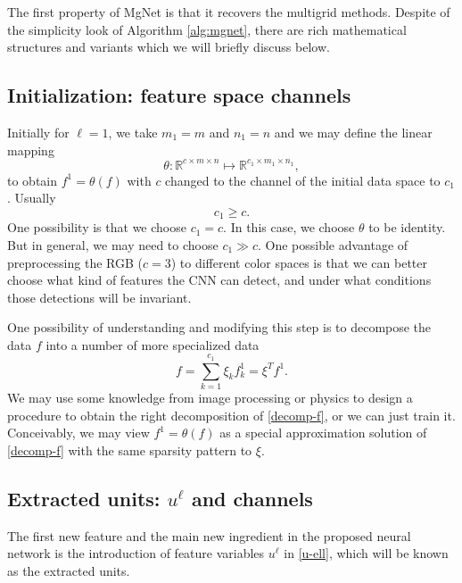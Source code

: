 The first property of MgNet is that it recovers the multigrid methods.
Despite of the simplicity look of Algorithm \ref{alg:mgnet}, there
are rich mathematical structures and variants which we will briefly discuss below.

\subsection{Initialization: feature space channels}
Initially for $\ell=1$,  we take $m_1 = m$ and $n_1 = n$ and we may define the linear mapping 
\begin{equation}
\label{eq:6}
\theta: \mathbb R^{c \times m\times n }
\mapsto \mathbb R^{c_1 \times m_1\times n_1 },
\end{equation}
to obtain $f^{1} = \theta(f)$ with $c$ %
changed to the channel of the initial
data space to $c_1$.   Usually
\begin{equation}
\label{cc}
c_1\ge c.  
\end{equation}
One possibility is that we choose $c_1=c$.  In this case, we choose
$\theta$ to be identity.   But in general, we may need to choose $c_1\gg
c$. One possible advantage of preprocessing the RGB ($c=3$) to 
different color spaces is that we can better choose what kind of
features the CNN can detect, and under what 
conditions those detections will be invariant.

One possibility of understanding and modifying this step 
is to decompose the data $f$ into a number of more
specialized data
\begin{equation}
\label{decomp-f}
f=\sum_{k=1}^{c_1}\xi_kf^1_k  =\xi^Tf^1.
\end{equation}
We may use some knowledge from image processing or physics to
design a procedure to obtain the right decomposition of
\eqref{decomp-f}, or we can just train it. 
Conceivably, we may view $f^{1} = \theta(f)$ as a special approximation solution of
\eqref{decomp-f} with the same sparsity pattern to $\xi$. 

\subsection{Extracted units: $u^{\ell}$ and channels}
The first new feature and the main new ingredient 
in the proposed neural network is the introduction 
of feature variables  $u^{\ell}$ in \eqref{u-ell}, which will be known
as the extracted units. 

